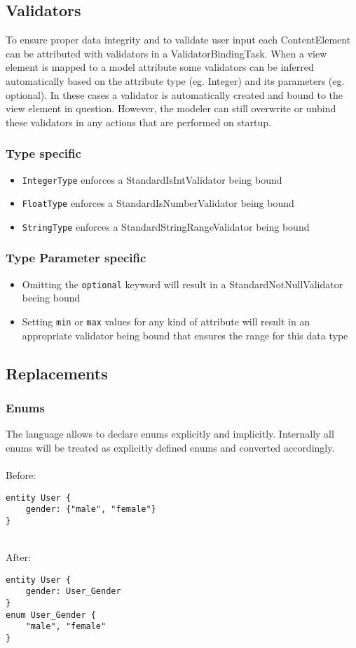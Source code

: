 \subsection{Validators}
To ensure proper data integrity and to validate user input each ContentElement can be attributed with validators in a ValidatorBindingTask. When a view element is mapped to a model attribute some validators can be inferred automatically based on the attribute type (eg. Integer) and its parameters (eg. optional). In these cases a validator is automatically created and bound to the view element in question. However, the modeler can still overwrite or unbind these validators in any actions that are performed on startup.

\subsubsection{Type specific}
\begin{itemize}
\item \lstinline!IntegerType! enforces a StandardIsIntValidator being bound
\item \lstinline!FloatType! enforces a StandardIsNumberValidator being bound
\item \lstinline!StringType! enforces a StandardStringRangeValidator being bound
\end{itemize}

\subsubsection{Type Parameter specific}

\begin{itemize}
\item Omitting the \lstinline!optional! keyword will result in a StandardNotNullValidator beeing bound
\item Setting \lstinline!min! or \lstinline!max! values for any kind of attribute will result in an appropriate validator being bound that ensures the range for this data type
\end{itemize}

\subsection{Replacements}
\subsubsection{Enums}
The \MD language allows to declare enums explicitly and implicitly. Internally all enums will be treated as explicitly defined enums and converted accordingly. \\ \\
Before:
\begin{lstlisting}[language=MD2]
entity User {
	gender: {"male", "female"}
}
\end{lstlisting}
~
\\
After:
\begin{lstlisting}[language=MD2]
entity User {
	gender: User_Gender
}
enum User_Gender {
	"male", "female"
}
\end{lstlisting}


